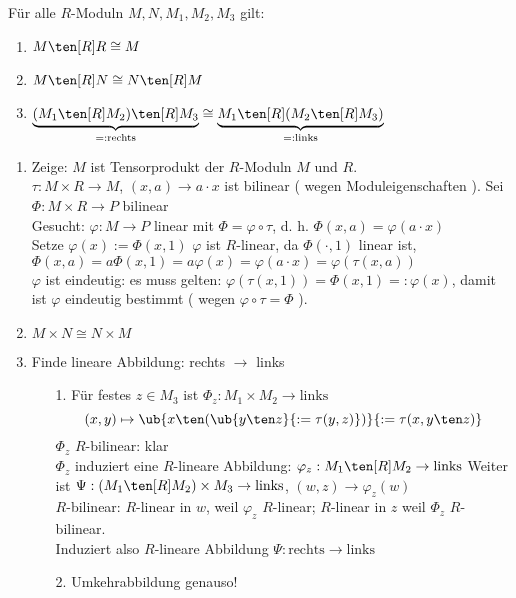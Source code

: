 \begin{Bem}
  Für alle $R$-Moduln $M, N, M_1, M_2, M_3$ gilt:
  \begin{enumerate}
  	\item $M \ten[R] R \cong M$
  	\item $M \ten[R] N \cong N \ten[R] M$
  	\item $\underbrace{(M_1 \ten[R] M_2) \ten[R] M_3}_{=: \text{rechts}} \cong 
	\underbrace{M_1 \ten[R] ( M_2 \ten[R] M_3)}_{=: \text{links}}$
  \end{enumerate}
\end{Bem}
\begin{Bew}
  \begin{enumerate}
    \item Zeige: $M$ ist Tensorprodukt der $R$-Moduln $M$ und $R$.\\
	  $\tau: M \times R \rightarrow M$, $(x,a) \rightarrow a \cdot x$ ist bilinear ( wegen 
	  Moduleigenschaften ). Sei $\Phi: M \times R \rightarrow P$ bilinear\\
	  Gesucht: $\varphi: M \rightarrow P$ linear mit $\Phi = \varphi \circ \tau$, d. h. 
	  $\Phi(x,a) = \varphi(a \cdot x)$\\
	  Setze $\varphi(x) := \Phi(x,1)$ $\varphi$ ist $R$-linear, da $\Phi( \cdot, 1)$ linear
	  ist, $\Phi(x,a) = a\Phi(x,1) = a\varphi(x) = \varphi(a \cdot x ) = \varphi(\tau(x,a))$\\
	  $\varphi$ ist eindeutig: es muss gelten: $\varphi(\tau(x,1)) = \Phi(x,1) =: \varphi(x)$, 
	  damit ist $\varphi$ eindeutig bestimmt ( wegen $\varphi \circ \tau = \Phi$ ).
    \item $M \times N \cong N \times M$
    \item Finde lineare Abbildung: rechts $\rightarrow$ links
	  \begin{enumerate}
	    \item[ 1. ] Für festes $z \in M_3$ ist $\Phi_z: M_1 \times M_2 \rightarrow \text{links}$ 
		  \[
		  (x,y) \mapsto \ub{x \ten (\ub{y \ten z}{:= \tau ( y,z )})}{:=\tau(x,y\ten z)}
		  \]
		  $\Phi_z$ $R$-bilinear: klar\\
		  $\Phi_z$ induziert eine $R$-lineare Abbildung: $\varphi_z: M_1 \ten[R] M_2 \rightarrow \text{links}$
		  Weiter ist $\Psi: ( M_1 \ten[R] M_2 ) \times M_3 \rightarrow \text{links}$,
		  $(w,z) \rightarrow \varphi_z (w)$\\
		  $R$-bilinear: $R$-linear in $w$, weil $\varphi_z$ $R$-linear; $R$-linear in $z$ weil $\Phi_z$ $R$-bilinear.\\
		  Induziert also $R$-lineare Abbildung $\Psi: \text{rechts} \rightarrow \text{links}$
	    \item[ 2. ] Umkehrabbildung genauso!
	  \end{enumerate}
  \end{enumerate}
\end{Bew}

